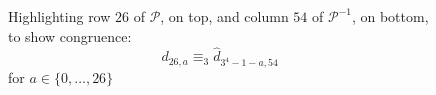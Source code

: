 
\begin{figure}[p]

    \noindent{}

    \vskip1cm

    \noindent{}

    \captionsetup{singlelinecheck=off}
    \caption[$\mathcal{P}$'s row $26$ and $\mathcal{P}^{-1}$'s column $54$ ]
        { Highlighting row $26$ of $\mathcal{P}$, on top, and column $54$ of $\mathcal{P}^{-1}$, on bottom,
            to show congruence: 
            \begin{displaymath}
                d_{26,a} \equiv_{3} \hat{d}_{3^4 -1-a,54} 
            \end{displaymath}
            for $a\in\lbrace0,\ldots,26\rbrace$ 
        }


    \label{fig:pascal:standard:mod3:congruence:row:26}

\end{figure}
